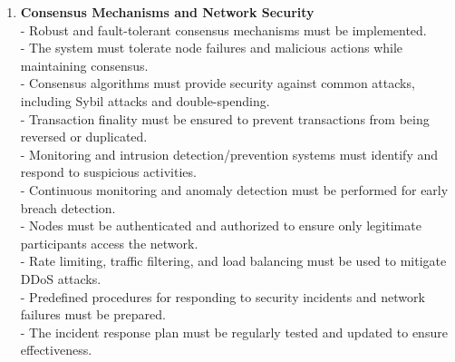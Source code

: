 \begin{enumerate}[label=(\arabic*)]
	\item\textbf{Consensus Mechanisms and Network Security}\\
	- Robust and fault-tolerant consensus mechanisms must be implemented.\\
	- The system must tolerate node failures and malicious actions while maintaining consensus.\\
	- Consensus algorithms must provide security against common attacks, including Sybil attacks and double-spending.\\
	- Transaction finality must be ensured to prevent transactions from being reversed or duplicated.\\
	- Monitoring and intrusion detection/prevention systems must identify and respond to suspicious activities.\\
	- Continuous monitoring and anomaly detection must be performed for early breach detection.\\
	- Nodes must be authenticated and authorized to ensure only legitimate participants access the network.\\
	- Rate limiting, traffic filtering, and load balancing must be used to mitigate DDoS attacks.\\
	- Predefined procedures for responding to security incidents and network failures must be prepared.\\
	- The incident response plan must be regularly tested and updated to ensure effectiveness.\\
	

\end{enumerate}

